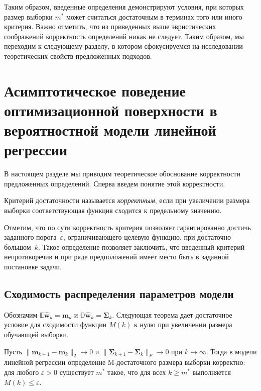 Таким образом, введенные определения демонстрируют условия, при которых размер выборки $m^*$ может считаться достаточным в терминах того или иного критерия. Важно отметить, что из приведенных выше эвристических соображений корректность определений никак не следует. Таким образом, мы переходим к следующему разделу, в котором сфокусируемся на исследовании теоретических свойств предложенных подходов.

\section{Асимптотическое поведение оптимизационной поверхности в вероятностной модели линейной регрессии}\label{sec:linear-theory}

В настоящем разделе мы приводим теоретическое обоснование корректности предложенных определений. Сперва введем понятие этой корректности.

\begin{definition}
    Критерий достаточности называется \emph{корректным}, если при увеличении размера выборки соответствующая функция сходится к предельному значению.
\end{definition}

Отметим, что по сути корректность критерия позволяет гарантированно достичь заданного порога~$\varepsilon$, ограничивающего целевую функцию, при достаточно большом~$k$. Такое определение позволяет заключить, что введенный критерий непротиворечив и при ряде предположений имеет место быть в заданной постановке задачи.

\subsection{Сходимость распределения параметров модели}

Обозначим $\mathbb{E} \hat{\mathbf{w}}_k = \mathbf{m}_k$ и $\mathbb{D} \hat{\mathbf{w}}_k = \boldsymbol{\Sigma}_k$. Следующая теорема дает достаточное условие для сходимости функции $M(k)$ к нулю при увеличении размера обучающей выборки.

\begin{theorem}\label{th:M-sufficient}
    Пусть $\|\mathbf{m}_{k+1} - \mathbf{m}_k\|_2 \to 0$ и $\|\boldsymbol{\Sigma}_{k+1} - \boldsymbol{\Sigma}_k\|_F \to 0$ при $k \to \infty$. Тогда в модели линейной регрессии определение M-достаточного размера выборки корректно: для любого $\varepsilon > 0$ существует $m^*$ такое, что для всех $k \geqslant m^*$ выполняется $M(k) \leqslant \varepsilon$.
\end{theorem}

